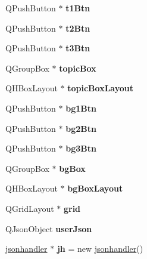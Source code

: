 \begin{DoxyCompactItemize}
Q\+Push\+Button $\ast$ {\bfseries t1\+Btn}
\item 
\mbox{\label{classg1__settings_aa944758a294099c7376939b47e159ffa}} 
Q\+Push\+Button $\ast$ {\bfseries t2\+Btn}
\item 
\mbox{\label{classg1__settings_a7e8211d3e45f5c436ced139f39214859}} 
Q\+Push\+Button $\ast$ {\bfseries t3\+Btn}
\item 
\mbox{\label{classg1__settings_a344e4a24c172591f69216bb08699288a}} 
Q\+Group\+Box $\ast$ {\bfseries topic\+Box}
\item 
\mbox{\label{classg1__settings_ac9a6fa417d9844cf50ff4973bbbe9677}} 
Q\+H\+Box\+Layout $\ast$ {\bfseries topic\+Box\+Layout}
\item 
\mbox{\label{classg1__settings_a839020acfd551c2c959401f796bb330b}} 
Q\+Push\+Button $\ast$ {\bfseries bg1\+Btn}
\item 
\mbox{\label{classg1__settings_aceea6ab2c98e77a8bcdc33dc048a4066}} 
Q\+Push\+Button $\ast$ {\bfseries bg2\+Btn}
\item 
\mbox{\label{classg1__settings_a1fda77309f20856876b7ac445c17d8f3}} 
Q\+Push\+Button $\ast$ {\bfseries bg3\+Btn}
\item 
\mbox{\label{classg1__settings_ab1184f542509b44f21b3b250c640cb59}} 
Q\+Group\+Box $\ast$ {\bfseries bg\+Box}
\item 
\mbox{\label{classg1__settings_a7e51c7bc608d4ecf4e1201794a4d391c}} 
Q\+H\+Box\+Layout $\ast$ {\bfseries bg\+Box\+Layout}
\item 
\mbox{\label{classg1__settings_a2c5a6c03e4beee3dcac5ebf101452649}} 
Q\+Grid\+Layout $\ast$ {\bfseries grid}
\item 
\mbox{\label{classg1__settings_a37b7448a79081797d2f3a2a15e183bb7}} 
Q\+Json\+Object {\bfseries user\+Json}
\item 
\mbox{\label{classg1__settings_a116b00d120216a239d6706997b456b62}} 
\hyperlink{classjsonhandler}{jsonhandler} $\ast$ {\bfseries jh} = new \hyperlink{classjsonhandler}{jsonhandler}()
\end{DoxyCompactItemize}


